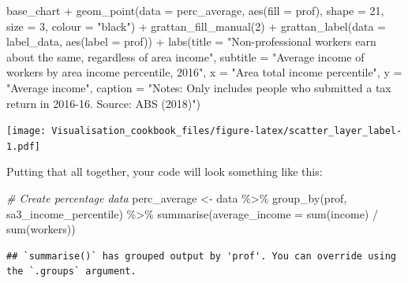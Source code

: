 \documentclass[
]{book}
\newenvironment{Shaded}{\begin{snugshade}}{\end{snugshade}}
\newcommand{\AttributeTok}[1]{\textcolor[rgb]{0.77,0.63,0.00}{#1}}
\newcommand{\CommentTok}[1]{\textcolor[rgb]{0.56,0.35,0.01}{\textit{#1}}}
\newcommand{\DecValTok}[1]{\textcolor[rgb]{0.00,0.00,0.81}{#1}}
\newcommand{\FunctionTok}[1]{\textcolor[rgb]{0.00,0.00,0.00}{#1}}
\newcommand{\NormalTok}[1]{#1}
\newcommand{\OtherTok}[1]{\textcolor[rgb]{0.56,0.35,0.01}{#1}}
\newcommand{\SpecialCharTok}[1]{\textcolor[rgb]{0.00,0.00,0.00}{#1}}
\newcommand{\StringTok}[1]{\textcolor[rgb]{0.31,0.60,0.02}{#1}}
\begin{document}
\begin{Shaded}
\begin{Highlighting}[]
\NormalTok{base\_chart }\SpecialCharTok{+}
  \FunctionTok{geom\_point}\NormalTok{(}\AttributeTok{data =}\NormalTok{ perc\_average,}
             \FunctionTok{aes}\NormalTok{(}\AttributeTok{fill =}\NormalTok{ prof),}
             \AttributeTok{shape =} \DecValTok{21}\NormalTok{,}
             \AttributeTok{size =} \DecValTok{3}\NormalTok{, }
             \AttributeTok{colour =} \StringTok{"black"}\NormalTok{) }\SpecialCharTok{+} 
  \FunctionTok{grattan\_fill\_manual}\NormalTok{(}\DecValTok{2}\NormalTok{) }\SpecialCharTok{+} 
  \FunctionTok{grattan\_label}\NormalTok{(}\AttributeTok{data =}\NormalTok{ label\_data,}
                \FunctionTok{aes}\NormalTok{(}\AttributeTok{label =}\NormalTok{ prof)) }\SpecialCharTok{+} 
  \FunctionTok{labs}\NormalTok{(}\AttributeTok{title =} \StringTok{"Non{-}professional workers earn about the same, regardless of area income"}\NormalTok{,}
       \AttributeTok{subtitle =} \StringTok{"Average income of workers by area income percentile, 2016"}\NormalTok{,}
       \AttributeTok{x =} \StringTok{"Area total income percentile"}\NormalTok{,}
       \AttributeTok{y =} \StringTok{"Average income"}\NormalTok{,}
       \AttributeTok{caption =} \StringTok{"Notes: Only includes people who submitted a tax return in 2016{-}16. Source: ABS (2018)"}\NormalTok{)}
\end{Highlighting}
\end{Shaded}

\texttt{[image: Visualisation\_cookbook\_files/figure-latex/scatter\_layer\_label-1.pdf]}

Putting that all together, your code will look something like this:

\begin{Shaded}
\begin{Highlighting}[]
\CommentTok{\# Create percentage data}
\NormalTok{perc\_average }\OtherTok{\textless{}{-}}\NormalTok{ data }\SpecialCharTok{\%\textgreater{}\%} 
  \FunctionTok{group\_by}\NormalTok{(prof, sa3\_income\_percentile) }\SpecialCharTok{\%\textgreater{}\%} 
  \FunctionTok{summarise}\NormalTok{(}\AttributeTok{average\_income =} \FunctionTok{sum}\NormalTok{(income) }\SpecialCharTok{/} \FunctionTok{sum}\NormalTok{(workers))}
\end{Highlighting}
\end{Shaded}

\begin{verbatim}
## `summarise()` has grouped output by 'prof'. You can override using the `.groups` argument.
\end{verbatim}
\end{document}
